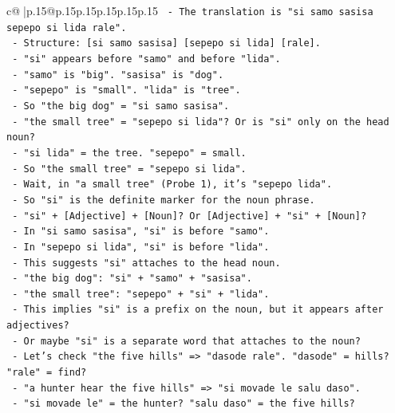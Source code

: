 \documentclass{article}
\begin{document}
{\begin{supertabular}{c@{$\;$}|p{.15\linewidth}@{}p{.15\linewidth}p{.15\linewidth}p{.15\linewidth}p{.15\linewidth}p{.15\linewidth}}
{{{\texttt{             {-} The translation is "si samo sasisa sepepo si lida rale".} \\
\texttt{             {-} Structure: {[}si samo sasisa{]} {[}sepepo si lida{]} {[}rale{]}.} \\
\texttt{             {-} "si" appears before "samo" and before "lida".} \\
\texttt{             {-} "samo" is "big". "sasisa" is "dog".} \\
\texttt{             {-} "sepepo" is "small". "lida" is "tree".} \\
\texttt{             {-} So "the big dog" = "si samo sasisa".} \\
\texttt{             {-} "the small tree" = "sepepo si lida"? Or is "si" only on the head noun?} \\
\texttt{             {-} "si lida" = the tree. "sepepo" = small.} \\
\texttt{             {-} So "the small tree" = "sepepo si lida".} \\
\texttt{             {-} Wait, in "a small tree" (Probe 1), it's "sepepo lida".} \\
\texttt{             {-} So "si" is the definite marker for the noun phrase.} \\
\texttt{             {-} "si" + {[}Adjective{]} + {[}Noun{]}? Or {[}Adjective{]} + "si" + {[}Noun{]}?} \\
\texttt{             {-} In "si samo sasisa", "si" is before "samo".} \\
\texttt{             {-} In "sepepo si lida", "si" is before "lida".} \\
\texttt{             {-} This suggests "si" attaches to the head noun.} \\
\texttt{             {-} "the big dog": "si" + "samo" + "sasisa".} \\
\texttt{             {-} "the small tree": "sepepo" + "si" + "lida".} \\
\texttt{             {-} This implies "si" is a prefix on the noun, but it appears after adjectives?} \\
\texttt{             {-} Or maybe "si" is a separate word that attaches to the noun?} \\
\texttt{             {-} Let's check "the five hills" => "dasode rale". "dasode" = hills? "rale" = find?} \\
\texttt{             {-} "a hunter hear the five hills" => "si movade le salu daso".} \\
\texttt{               {-} "si movade le" = the hunter? "salu daso" = the five hills?} \\
}}}
\end{supertabular}}
\end{document}
